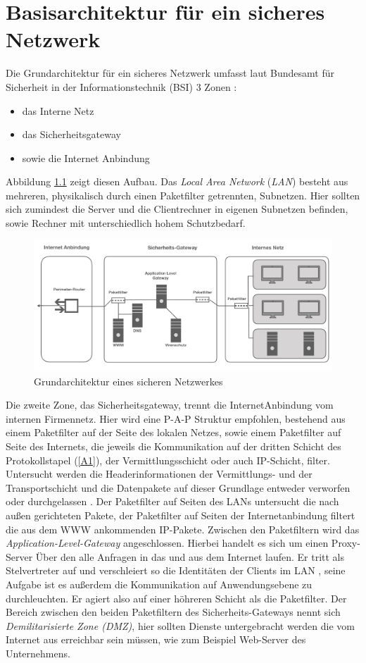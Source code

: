 \chapter{Basisarchitektur für ein sicheres Netzwerk}
Die Grundarchitektur für ein sicheres Netzwerk umfasst laut Bundesamt für Sicherheit in der Informationstechnik (BSI) 3 Zonen \cite{isi-lana}: 
\begin{itemize}
	\item das Interne Netz 
	\item das Sicherheitsgateway
	\item sowie die Internet Anbindung	
\end{itemize}
Abbildung \ref{grundarch} zeigt diesen Aufbau. Das \emph{Local Area Network} (\emph{LAN}) besteht aus mehreren, physikalisch durch einen Paketfilter getrennten, Subnetzen. Hier sollten sich zumindest die Server und die Clientrechner in eigenen Subnetzen befinden, sowie Rechner mit unterschiedlich hohem Schutzbedarf. 

\begin{figure}[h]
	\includegraphics[width=\linewidth]{grundarchitektur}
	\caption{Grundarchitektur eines sicheren Netzwerkes}
	\label{grundarch}
\end{figure}


Die zweite Zone, das Sicherheitsgateway, trennt die InternetAnbindung vom internen Firmennetz. Hier wird eine P-A-P Struktur empfohlen, bestehend aus einem Paketfilter auf der Seite des lokalen Netzes, sowie einem Paketfilter auf Seite des Internets, die jeweils die Kommunikation auf der dritten Schicht des Protokollstapel (\ref{A1}), der Vermittlungsschicht oder auch IP-Schicht, filter. Untersucht werden die Headerinformationen der Vermittlungs- und der Transportschicht und die Datenpakete auf dieser Grundlage entweder verworfen oder durchgelassen  \cite{isi-lana}.
 Der Paketfilter auf Seiten des LANs untersucht die nach außen gerichteten Pakete, der Paketfilter auf Seiten der Internetanbindung filtert die aus dem WWW ankommenden IP-Pakete. Zwischen den Paketfiltern wird das \emph{Application-Level-Gateway} angeschlossen. Hierbei handelt es sich um einen Proxy-Server Über den alle Anfragen in das und aus dem Internet laufen. Er tritt als Stelvertreter auf und verschleiert so die Identitäten der  Clients im LAN \cite{zisler2018computer}, seine Aufgabe ist es außerdem die Kommunikation auf Anwendungsebene zu durchleuchten. Er agiert also auf einer höhreren Schicht als die Paketfilter. 
 Der Bereich zwischen den beiden Paketfiltern des Sicherheits-Gateways nennt sich \emph{Demilitarisierte Zone (DMZ)}, hier sollten Dienste untergebracht werden die vom Internet aus erreichbar sein müssen, wie zum Beispiel Web-Server des Unternehmens. 
 

